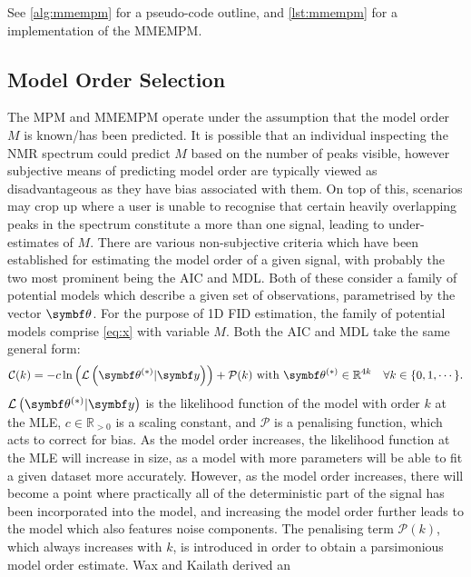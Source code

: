 See \cref{alg:mmempm} for a pseudo-code outline, and \cref{lst:mmempm} for a
\Python implementation of the \ac{MMEMPM}.

\subsection{Model Order Selection}
\label{subsec:model-order}
The \ac{MPM} and \ac{MMEMPM} operate under the assumption that the model order
$M$ is known/has been predicted.
It is possible that an individual inspecting the \ac{NMR} spectrum could
predict $M$ based on the number of peaks visible, however subjective means of
predicting model order are typically viewed as disadvantageous as they have bias
associated with them. On top of this, scenarios may crop up where a user is
unable to recognise that certain heavily overlapping peaks in the spectrum
constitute a more than one signal, leading to under-estimates of $M$.
There are various non-subjective criteria which have been established for
estimating the model order of a given signal, with probably the two most
prominent being the \ac{AIC}\cite{Akaike1974} and
\ac{MDL}\cite{Schwarz1978,Rissanen1978}. Both of these consider a family of
potential models which describe a given set of observations, parametrised by
the vector $\bth$. For the purpose of \ac{1D} \ac{FID} estimation, the family
of potential models comprise \cref{eq:x} with variable $M$. Both the \ac{AIC}
and \ac{MDL} take the same general form:
\begin{equation}
    \mathcal{C}(k) = -c \ln \left(\mathcal{L} \left(\bthstar | \by \right)
    \right) + \mathcal{P}(k) \text{ with } \bthstar \in \mathbb{R}^{4k}
    \quad \forall k \in \lbrace 0, 1, \cdots \rbrace.
\end{equation}
 $\mathcal{L} \left(\bthstar |
\by \right)$ is the likelihood
function of the model with order $k$ at the \ac{MLE}, $c \in
\mathbb{R}_{>0}$ is a scaling constant, and $\mathcal{P}$ is a penalising
function, which acts to correct
for bias. As the model order increases, the likelihood function at the \ac{MLE}
will increase in size, as a model with more parameters will be able to fit a
given dataset more accurately. However, as the model order increases, there will
become a point where practically all of the deterministic part of the signal
has been incorporated into the model, and increasing the model order further
leads to the model which also features noise components. The penalising
term $\mathcal{P}(k)$, which always increases with $k$, is introduced in order to
obtain a parsimonious model order estimate. Wax and Kailath derived an
